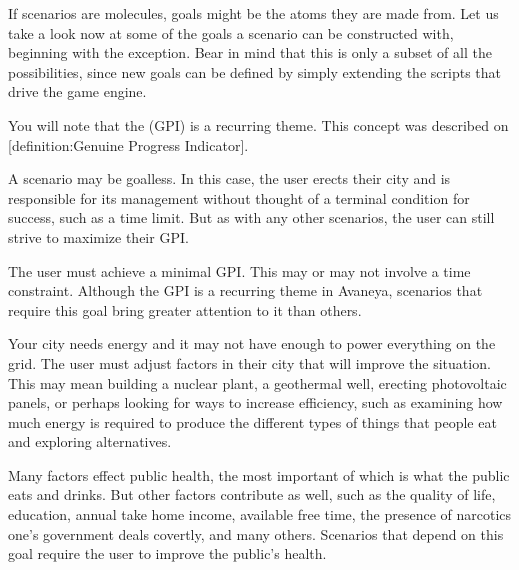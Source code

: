 

If scenarios are molecules, goals might be the atoms they are made from. Let us take a look now at some of the goals a scenario can be constructed with, beginning with the exception. Bear in mind that this is only a subset of all the possibilities, since new goals can be defined by simply extending the scripts that drive the game engine. 

You will note that the  (GPI) is a recurring theme. This concept was described on [definition:Genuine Progress Indicator].

\startitemize[4]
\setupwhitespace[big]

A scenario may be goalless. In this case, the user erects their city and is responsible for its management without thought of a terminal condition for success, such as a time limit. But as with any other scenarios, the user can still strive to maximize their GPI.


The user must achieve a minimal GPI. This may or may not involve a time constraint. Although the GPI is a recurring theme in Avaneya, scenarios that require this goal bring greater attention to it than others.


Your city needs energy and it may not have enough to power everything on the grid. The user must adjust factors in their city that will improve the situation. This may mean building a nuclear plant, a geothermal well, erecting photovoltaic panels, or perhaps looking for ways to increase efficiency, such as examining how much energy is required to produce the different types of things that people eat and exploring alternatives.


Many factors effect public health, the most important of which is what the public eats and drinks. But other factors contribute as well, such as the quality of life, education, annual take home income, available free time, the presence of narcotics one's government deals covertly, and many others. Scenarios that depend on this goal require the user to improve the public's health.

